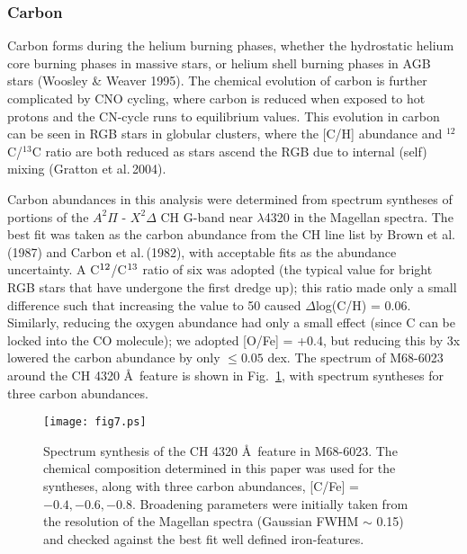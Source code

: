 \documentclass{emulateapj}
\newcommand\etal{{\rm et al.\,}}
\begin{document}
\subsubsection{Carbon}

Carbon forms during the helium burning phases, whether the hydrostatic
helium core burning phases in massive stars, or helium shell burning
phases in AGB stars (Woosley \& Weaver 1995).  
The chemical evolution of carbon is further complicated 
by CNO cycling, where carbon is reduced when exposed to hot protons 
and the CN-cycle runs to equilibrium values.    This evolution in carbon 
can be seen in RGB stars in globular clusters, where the [C/H] abundance 
and $^{12}$C/$^{13}$C ratio are both reduced as stars ascend the RGB due 
to internal (self) mixing (Gratton \etal 2004). 
 
Carbon abundances in this analysis were determined from spectrum 
syntheses of portions of the $A^2\Pi$ - $X^2\Delta$ CH G-band 
near $\lambda$4320 in the Magellan spectra.    The best fit
was taken as the carbon abundance from the CH line list by 
Brown \etal (1987) and Carbon \etal (1982), with acceptable fits 
as the abundance uncertainty.   A C$^{\rm 12}$/C$^{\rm 13}$ ratio 
of six was adopted (the typical value for bright RGB stars that have 
undergone the first dredge up); this ratio made only a small 
difference such that increasing the value to 50 caused 
$\Delta$log(C/H) = 0.06.   Similarly, reducing the oxygen
abundance had only a small effect (since C can be locked into the CO 
molecule); we adopted [O/Fe] = +0.4, but reducing this 
by 3x lowered the carbon abundance by only $\le 0.05$ dex.
%
The spectrum of M68-6023 around the CH 4320 \AA\ feature is
shown in Fig.~\ref{ch}, with spectrum syntheses for three 
carbon abundances.



\begin{figure}[t]
\texttt{[image: fig7.ps]}
\caption{Spectrum synthesis of the CH 4320 \AA\ feature in
M68-6023.   The chemical composition determined in this paper
was used for the syntheses, along with three carbon abundances, 
[C/Fe] = $-0.4, -0.6, -0.8$.   Broadening parameters were
initially taken from the resolution of the Magellan spectra
(Gaussian FWHM $\sim$ 0.15)
and checked against the best fit well defined iron-features. \\
}
\label{ch}
\end{figure}
\end{document}
